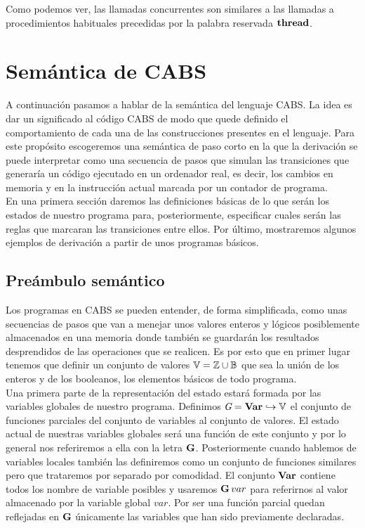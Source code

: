 
Como podemos ver, las llamadas concurrentes son similares a las llamadas a procedimientos habituales precedidas por la palabra reservada $\textbf{thread}$.

\section{Semántica de CABS}
A continuación pasamos a hablar de la semántica del lenguaje CABS. La idea es dar un significado al código CABS de modo que quede definido el comportamiento de cada una de las construcciones presentes en el lenguaje. Para este propósito escogeremos una semántica de paso corto en la que la derivación se puede interpretar como una secuencia de pasos que simulan las transiciones que generaría un código ejecutado en un ordenador real, es decir, los cambios en memoria y en la instrucción actual marcada por un contador de programa.\\

En una primera sección daremos las definiciones básicas de lo que serán los estados de nuestro programa para, posteriormente, especificar cuales serán las reglas que marcaran las transiciones entre ellos. Por último, mostraremos algunos ejemplos de derivación a partir de unos programas básicos.

\subsection{Preámbulo semántico}
Los programas en CABS se pueden entender, de forma simplificada, como unas secuencias de pasos que van a menejar unos valores enteros y lógicos posiblemente almacenados en una memoria donde también se guardarán los resultados desprendidos de las operaciones que se realicen. Es por esto que en primer lugar tenemos que definir un conjunto de valores $\mathbb{V} = \mathbb{Z} \cup \mathbb{B}$ que sea la unión de los enteros y de los booleanos, los elementos básicos de todo programa.\\

Una primera parte de la representación del estado estará formada por las variables globales de nuestro programa. Definimos $\textit{G} = \textbf{Var} \hookrightarrow \mathbb{V}$ el conjunto de funciones parciales del conjunto de variables al conjunto de valores. El estado actual de nuestras variables globales será una función de este conjunto y por lo general nos referiremos a ella con la letra $\mathbf{G}$. Posteriormente cuando hablemos de variables locales también las definiremos como un conjunto de funciones similares pero que trataremos por separado por comodidad. El conjunto $\textbf{Var}$ contiene todos los nombre de variable posibles y usaremos $\mathbf{G}\,var$ para referirnos al valor almacenado por la variable global $var$. Por ser una función parcial quedan reflejadas en $\mathbf{G}$ únicamente las variables que han sido previamente declaradas.\\

